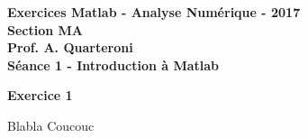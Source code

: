 \begin{center}
  \textbf{Exercices Matlab - Analyse Numérique - 2017 \\
  Section MA \\
  Prof. A. Quarteroni \\
  Séance 1 - Introduction à Matlab}
\end{center}


\vspace{10mm}

\textbf{Exercice 1 \\}



Blabla Coucouc